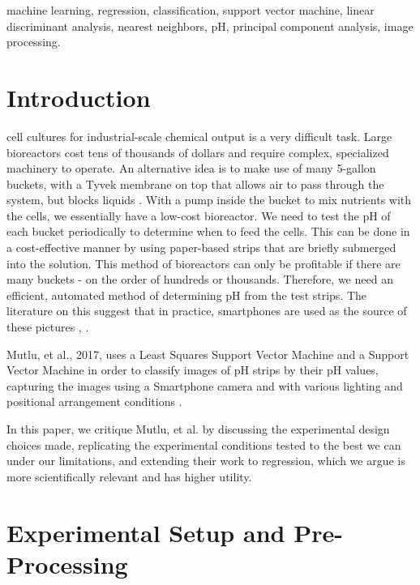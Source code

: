 \documentclass[journal]{IEEEtran}
\begin{document}
\begin{IEEEkeywords}
machine learning, regression, classification, support vector machine, linear discriminant analysis, nearest neighbors, pH, principal component analysis, image processing.
\end{IEEEkeywords}

\IEEEpeerreviewmaketitle

\section{Introduction}
 cell cultures for industrial-scale chemical output is a very difficult task. Large bioreactors cost tens of thousands of dollars and require complex, specialized machinery to operate. An alternative idea is to make use of many 5-gallon buckets, with a Tyvek membrane on top that allows air to pass through the system, but blocks liquids \cite{anderson}. With a pump inside the bucket to mix nutrients with the cells, we essentially have a low-cost bioreactor. We need to test the pH of each bucket periodically to determine when to feed the cells. This can be done in a cost-effective manner by using paper-based strips that are briefly submerged into the solution. This method of bioreactors can only be profitable if there are many buckets - on the order of hundreds or thousands. Therefore, we need an efficient, automated method of determining pH from the test strips. The literature on this suggest that in practice, smartphones are used as the source of these pictures \cite{mutlu}, \cite{kim}.

Mutlu, et al., 2017, uses a Least Squares Support Vector Machine and a Support Vector Machine in order to classify images of pH strips by their pH values, capturing the images using a Smartphone camera and with various lighting and positional arrangement conditions \cite{mutlu}.

In this paper, we critique Mutlu, et al. by discussing the experimental design choices made, replicating the experimental conditions tested to the best we can under our limitations, and extending their work to regression, which we argue is more scientifically relevant and has higher utility.

\section{Experimental Setup and Pre-Processing}
\end{document}
